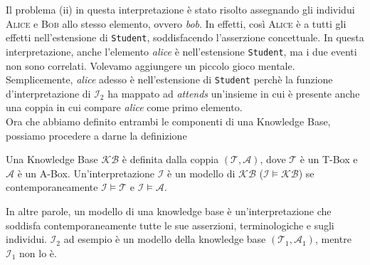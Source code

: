 Il problema (ii) in questa interpretazione è stato risolto assegnando gli individui \textsc{Alice} e \textsc{Bob} allo stesso elemento, ovvero \textit{bob}. In effetti, così \textsc{Alice} è a tutti gli effetti nell'estensione di \texttt{Student}, soddisfacendo l'asserzione concettuale. In questa interpretazione, anche l'elemento \textit{alice} è nell'estensione \texttt{Student}, ma i due eventi non sono correlati. Volevamo aggiungere un piccolo gioco mentale. Semplicemente, \textit{alice} adesso è nell'estensione di \texttt{Student} perchè la funzione d'interpretazione di $\mathcal{I}_2$ ha mappato ad \textit{attends} un'insieme in cui è presente anche una coppia in cui compare \textit{alice} come primo elemento.
\\
Ora che abbiamo definito entrambi le componenti di una Knowledge Base, possiamo procedere a darne la definizione
\begin{definition}
	Una Knowledge Base $\mathcal{KB}$ è definita dalla coppia $(\mathcal{T}, \mathcal{A})$, dove $\mathcal{T}$ è un T-Box e $\mathcal{A}$ è un A-Box. Un’interpretazione $\mathcal{I}$ è un modello di $\mathcal{KB}$ ($\mathcal{I} \models \mathcal{KB}$) se contemporaneamente $\mathcal{I} \models \mathcal{T}$ e $\mathcal{I} \models \mathcal{A}$.
\end{definition}
\noindent
In altre parole, un modello di una knowledge base è un'interpretazione che soddisfa contemporaneamente tutte le sue asserzioni, terminologiche e sugli individui.  $\mathcal{I}_2$ ad esempio è un modello della knowledge base $(\mathcal{T}_1, \mathcal{A}_1)$, mentre  $\mathcal{I}_1$ non lo è.
